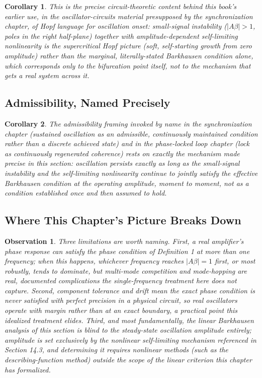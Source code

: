 \documentclass[12pt]{article}
\newtheorem{corollary}{Corollary}
\newtheorem{observation}{Observation}
\begin{document}
\begin{corollary}
This is the precise circuit-theoretic content behind this book's earlier use, in the oscillator-circuits material presupposed by the synchronization chapter, of Hopf language for oscillation onset: small-signal instability ($|A\beta|>1$, poles in the right half-plane) together with amplitude-dependent self-limiting nonlinearity is the supercritical Hopf picture (soft, self-starting growth from zero amplitude) rather than the marginal, literally-stated Barkhausen condition alone, which corresponds only to the bifurcation point itself, not to the mechanism that gets a real system across it.
\end{corollary}

\subsection{Admissibility, Named Precisely}

\begin{corollary}
The admissibility framing invoked by name in the synchronization chapter (sustained oscillation as an admissible, continuously maintained condition rather than a discrete achieved state) and in the phase-locked loop chapter (lock as continuously regenerated coherence) rests on exactly the mechanism made precise in this section: oscillation persists exactly as long as the small-signal instability and the self-limiting nonlinearity continue to jointly satisfy the effective Barkhausen condition at the operating amplitude, moment to moment, not as a condition established once and then assumed to hold.
\end{corollary}

\subsection{Where This Chapter's Picture Breaks Down}

\begin{observation}
Three limitations are worth naming. First, a real amplifier's phase response can satisfy the phase condition of Definition 1 at more than one frequency; when this happens, whichever frequency reaches $|A\beta|=1$ first, or most robustly, tends to dominate, but multi-mode competition and mode-hopping are real, documented complications the single-frequency treatment here does not capture. Second, component tolerance and drift mean the exact phase condition is never satisfied with perfect precision in a physical circuit, so real oscillators operate with margin rather than at an exact boundary, a practical point this idealized treatment elides. Third, and most fundamentally, the linear Barkhausen analysis of this section is blind to the steady-state oscillation amplitude entirely; amplitude is set exclusively by the nonlinear self-limiting mechanism referenced in Section 14.3, and determining it requires nonlinear methods (such as the describing-function method) outside the scope of the linear criterion this chapter has formalized.
\end{observation}
\end{document}
